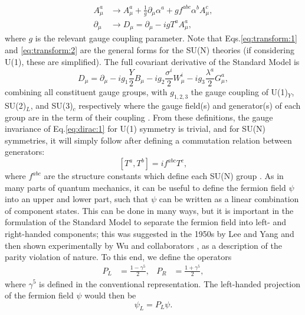 \documentclass[a4paper,12pt]{article}
\begin{document}
\begin{align}
    \label{eq:transform:1}
    A^a_\mu &\to A^a_\mu + \frac{1}{g}\partial_\mu\alpha^a + gf^{abc}\alpha^bA^c_\mu, \\
    \label{eq:transform:2}
    \partial_\mu &\to D_\mu = \partial_\mu - igT^aA^a_\mu,
\end{align}
where $g$ is the relevant gauge coupling parameter.
Note that Eqs.\eqref{eq:transform:1} and \eqref{eq:transform:2} are the general forms for the SU(N) theories (if considering U(1), these are simplified).
The full covariant derivative of the Standard Model is
\begin{equation}
    \label{eq:covar}
    D_\mu = \partial_\mu - ig_1\frac{Y}{2}B_\mu - ig_2\frac{\sigma^i}{2}W^i_\mu - ig_3\frac{\lambda^a}{2}G^a_\mu,
\end{equation}
combining all constituent gauge groups, with $g_{1,2,3}$ the gauge coupling of U(1)$_Y$, SU(2)$_L$, and SU(3)$_c$ respectively where the gauge field(s) and generator(s) of each group are in the term of their coupling \cite{kane}.   
From these definitions, the gauge invariance of Eq.\eqref{eq:dirac:1} for U(1) symmetry is trivial, and for SU(N) symmetries, it will simply follow after defining a commutation relation between generators:
\begin{equation}
    \label{eq:commute}
    [T^a,T^b] = if^{abc}T^c,
\end{equation}
where $f^{abc}$ are the structure constants which define each SU(N) group \cite{bail}. 
As in many parts of quantum mechanics, it can be useful to define the fermion field $\psi$ into an upper and lower part, such that $\psi$ can be written as a linear combination of component states. 
This can be done in many ways, but it is important in the formulation of the Standard Model to separate the fermion field into left- and right-handed components; this was suggested in the 1950s by Lee and Yang \cite{lee} and then shown experimentally by Wu and collaborators \cite{wu}, as a description of the parity violation of nature. 
To this end, we define the operators
\begin{align}
    \label{eq:helix}
    P_L &= \frac{1-\gamma^5}{2}, & P_R &= \frac{1+\gamma^5}{2},
\end{align}
where $\gamma^5$ is defined in the conventional representation. 
The left-handed projection of the fermion field $\psi$ would then be
\begin{equation}
    \label{eq:projection}
    \psi_L = P_L\psi.
\end{equation}
\end{document}
